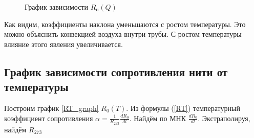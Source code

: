 \documentclass[a4paper, 12pt]{article}
\begin{document}
            \begin{figure}[ht]
                \caption{График зависимости $R_н(Q)$}
                \label{RQ_graph}
            \end{figure}

            Как видим, коэффициенты наклона уменьшаются с ростом температуры. Это можно объяснить конвекцией воздуха внутри трубы. С ростом температуры влияние этого явления увеличивается.

        \subsection{График зависимости сопротивления нити от температуры}

            Построим график \ref{RT_graph} $R_0(T)$. Из формулы (\ref{RT}) температурный коэффициент сопротивления $\alpha = \frac{1}{R_{273}}\frac{dR_0}{dt}$. Найдём по МНК $\frac{dR_0}{dt}$. Экстраполируя, найдём $R_{273}$
\end{document}
